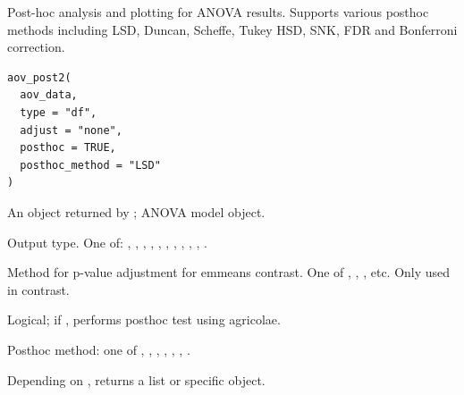 \documentclass[a4paper]{book}
\begin{document}
%
\begin{Description}
Post-hoc analysis and plotting for ANOVA results. Supports various posthoc methods
including LSD, Duncan, Scheffe, Tukey HSD, SNK, FDR and Bonferroni correction.
\end{Description}
%
\begin{Usage}
\begin{verbatim}
aov_post2(
  aov_data,
  type = "df",
  adjust = "none",
  posthoc = TRUE,
  posthoc_method = "LSD"
)
\end{verbatim}
\end{Usage}
%
\begin{Arguments}
\begin{ldescription}
\item[\code{aov\_data}] An object returned by ; ANOVA model object.

\item[\code{type}] Output type. One of: , , ,
, , , , , ,
, .

\item[\code{adjust}] Method for p-value adjustment for emmeans contrast. One of ,
, , etc. Only used in contrast.

\item[\code{posthoc}] Logical; if , performs posthoc test using agricolae.

\item[\code{posthoc\_method}] Posthoc method: one of , ,
, , , , .
\end{ldescription}
\end{Arguments}
%
\begin{Value}
Depending on , returns a list or specific object.
\end{Value}
%
\end{document}
